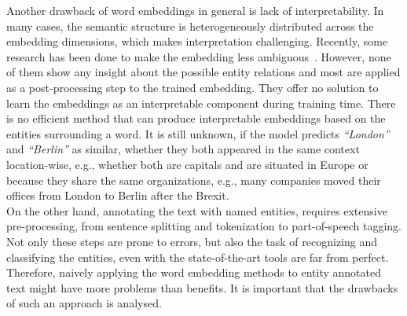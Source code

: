 Another drawback of word embeddings in general is lack of interpretability. In many cases, the semantic structure is heterogeneously distributed across the embedding dimensions, which makes interpretation challenging. Recently, some research has been done to make the embedding less ambiguous~. However, none of them show any insight about the possible entity relations and most are applied as a post-processing step to the trained embedding. They offer no solution to learn the embeddings as an interpretable component during training time. There is no efficient method that can produce interpretable embeddings based on the entities surrounding a word. It is still unknown, if the model predicts \emph{``London''} and \emph{``Berlin''} as similar, whether they both appeared in the same context location-wise, e.g., whether both are capitals and are situated in Europe or because they share the same organizations, e.g., many companies moved their offices from London to Berlin after the Brexit. \\
On the other hand, annotating the text with named entities, requires extensive pre-processing, from sentence splitting and tokenization to part-of-speech tagging. Not only these steps are prone to errors, but also the task of recognizing and classifying the entities, even with the state-of-the-art tools are far from perfect. Therefore, naively applying the word embedding methods to entity annotated text might have more problems than benefits. It is important that the drawbacks of such an approach is analysed. 

%

